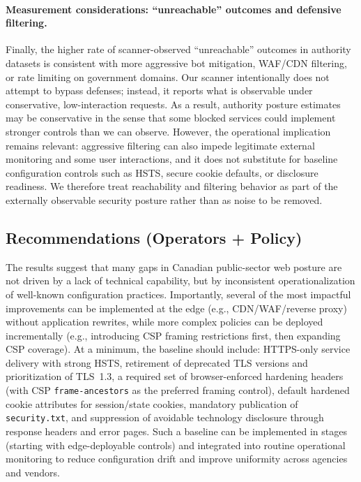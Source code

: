 \documentclass[a4paper,fleqn]{cas-sc}
\begin{document}
    \paragraph{Measurement considerations: ``unreachable'' outcomes and defensive filtering.}
    Finally, the higher rate of scanner-observed ``unreachable'' outcomes in authority datasets is consistent with more aggressive bot mitigation, WAF/CDN filtering, or rate limiting on government domains.
    Our scanner intentionally does not attempt to bypass defenses; instead, it reports what is observable under conservative, low-interaction requests. 
    As a result, authority posture estimates may be conservative in the sense that some blocked services could implement stronger controls than we can observe.
    However, the operational implication remains relevant: aggressive filtering can also impede legitimate external monitoring and some user interactions, and it does not substitute for baseline configuration controls such as HSTS, secure cookie defaults, or disclosure readiness. 
    We therefore treat reachability and filtering behavior as part of the externally observable security posture rather than as noise to be removed.
    
\subsection{Recommendations (Operators + Policy)}\label{sec:recommendations}

The results suggest that many gaps in Canadian public-sector web posture are not driven by a lack of technical capability, but by inconsistent operationalization of well-known configuration practices.
Importantly, several of the most impactful improvements can be implemented at the edge (e.g., CDN/WAF/reverse proxy) without application rewrites, while more complex policies can be deployed incrementally (e.g., introducing CSP framing restrictions first, then expanding CSP coverage). 
At a minimum, the baseline should include: HTTPS-only service delivery with strong HSTS, retirement of deprecated TLS versions and prioritization of TLS~1.3, a required set of browser-enforced hardening headers (with CSP \texttt{frame-ancestors} as the preferred framing control), default hardened cookie attributes for session/state cookies, mandatory publication of \texttt{security.txt}, and suppression of avoidable technology disclosure through response headers and error pages. Such a baseline can be implemented in stages (starting with edge-deployable controls) and integrated into routine operational monitoring to reduce configuration drift and improve uniformity across agencies and vendors. 
\end{document}
